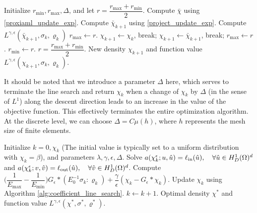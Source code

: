 \documentclass{amsart}
\begin{document}
\begin{algorithm}
\caption{The step-size line search algorithm}
\label{alg:coefficient_line_search}
\begin{algorithmic}[1]
\STATE Initialize $r_{\min},r_{\max},\Delta$, and let $r = \dfrac{r_{\max}+r_{\min}}{2}$.
    \STATE Compute $\bar\chi$ using \eqref{proxiaml_update_exp}.
    \STATE Compute $\bar{\chi}_{k+1}$ using \eqref{project_update_exp}.
    \STATE Compute $L^{\gamma,\epsilon}(\bar{\chi}_{k+1},\sigma_k,\varrho_k)$
    \STATE {}
    \STATE  $r_{\max} \leftarrow r$.
    \STATE{}
    \STATE $\chi_{k+1} \leftarrow \chi_k$, break;
    \STATE\ENDIF
    \STATE {}
    \STATE $\chi_{k+1} \leftarrow \bar{\chi}_{k+1}$, break;
    \STATE {}
    \STATE $r_{\max} \leftarrow r$.
    \STATE \ENDIF
    \STATE{} 
    \STATE $r_{\min} \leftarrow r$.
    \STATE \ENDIF
    \STATE $r=\dfrac{r_{\max}+r_{\min}}{2}$.
\ENDWHILE
\RETURN New density \( \chi_{k+1} \) and function value $L^{\gamma,\epsilon}(\chi_{k+1},\sigma_k,\varrho_k)$.
\end{algorithmic}
\end{algorithm}

It should be noted that we introduce a parameter \(\Delta\) here, which serves to terminate the line search and return \(\chi_k\) when a change of \(\chi_k\) by \(\Delta\) (in the sense of \(L^1\)) along the descent direction leads to an increase in the value of the objective function. This effectively terminates the entire optimization algorithm. At the discrete level, we can choose \(\Delta = C \mu(h)\), where \(h\) represents the mesh size of finite elements.

\begin{algorithm}
\caption{Gradient desecent algorithm for the compliant mechanisms problem}
\label{alg:monotonic_descen_with_penlty}
\begin{algorithmic}[1]
\STATE Initialize $k=0,\chi_k$ (The initial value is typically set to a uniform distribution with $ \chi_k = \beta $),  and parameters $\lambda,\gamma,\epsilon,\Delta$.
    \STATE Solve  $a(\chi_k^\epsilon;u,\hat{u})=\ell_{\rm in}(\hat{u}),\quad\forall\hat{u}\in H_D^1(\Omega)^d$ and $a(\chi_k^\epsilon;v,\hat{v})=\ell_{\rm out}(\hat{u}),\quad\forall\hat{v}\in H_D^1(\Omega)^d$.
    \STATE Compute $\Big(\dfrac{1}{E_{\max}}-\dfrac{1}{E_{\min}}\Big)G_\epsilon*(E_0^{-1}\sigma_k:\varrho_k) +\dfrac{\gamma}{\epsilon}(\chi_k-G_\epsilon*\chi_k)$.
    \STATE Update \( \chi_{k}\) using Algorithm \ref{alg:coefficient_line_search}.
    \STATE $k\leftarrow k+1$.
\ENDWHILE
\RETURN Optimal density \( \chi^* \) and function value $L^{\gamma,\epsilon}(\chi^*,\sigma^*,\varrho^*)$.
\end{algorithmic}
\end{algorithm}
\end{document}
